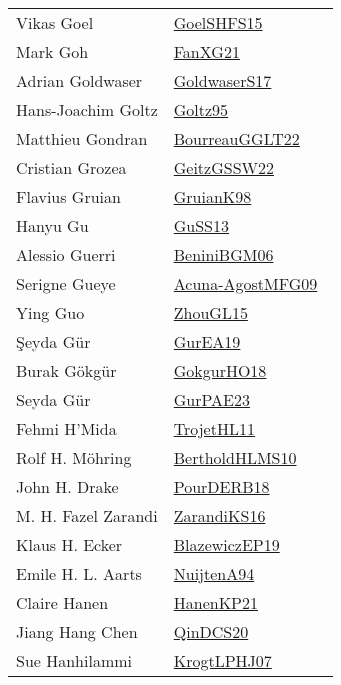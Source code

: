 {\begin{longtable}{p{4cm}p{20cm}}
Vikas Goel & \href{works/GoelSHFS15.pdf}{GoelSHFS15}~\cite{GoelSHFS15}\\
Mark Goh & \href{works/FanXG21.pdf}{FanXG21}~\cite{FanXG21}\\
Adrian Goldwaser & \href{works/GoldwaserS17.pdf}{GoldwaserS17}~\cite{GoldwaserS17}\\
Hans{-}Joachim Goltz & \href{works/Goltz95.pdf}{Goltz95}~\cite{Goltz95}\\
Matthieu Gondran & \href{works/BourreauGGLT22.pdf}{BourreauGGLT22}~\cite{BourreauGGLT22}\\
Cristian Grozea & \href{works/GeitzGSSW22.pdf}{GeitzGSSW22}~\cite{GeitzGSSW22}\\
Flavius Gruian & \href{works/GruianK98.pdf}{GruianK98}~\cite{GruianK98}\\
Hanyu Gu & \href{works/GuSS13.pdf}{GuSS13}~\cite{GuSS13}\\
Alessio Guerri & \href{works/BeniniBGM06.pdf}{BeniniBGM06}~\cite{BeniniBGM06}\\
Serigne Gueye & \href{works/Acuna-AgostMFG09.pdf}{Acuna-AgostMFG09}~\cite{Acuna-AgostMFG09}\\
Ying Guo & \href{works/ZhouGL15.pdf}{ZhouGL15}~\cite{ZhouGL15}\\
Şeyda G{\"u}r & \href{works/GurEA19.pdf}{GurEA19}~\cite{GurEA19}\\
Burak G{\"{o}}kg{\"{u}}r & \href{works/GokgurHO18.pdf}{GokgurHO18}~\cite{GokgurHO18}\\
Seyda G{\"{u}}r & \href{works/GurPAE23.pdf}{GurPAE23}~\cite{GurPAE23}\\
Fehmi H'Mida & \href{works/TrojetHL11.pdf}{TrojetHL11}~\cite{TrojetHL11}\\
Rolf H. M{\"{o}}hring & \href{works/BertholdHLMS10.pdf}{BertholdHLMS10}~\cite{BertholdHLMS10}\\
John H. Drake & \href{works/PourDERB18.pdf}{PourDERB18}~\cite{PourDERB18}\\
M. H. Fazel Zarandi & \href{works/ZarandiKS16.pdf}{ZarandiKS16}~\cite{ZarandiKS16}\\
Klaus H. Ecker & \href{}{BlazewiczEP19}~\cite{BlazewiczEP19}\\
Emile H. L. Aarts & \href{works/NuijtenA94.pdf}{NuijtenA94}~\cite{NuijtenA94}\\
Claire Hanen & \href{works/HanenKP21.pdf}{HanenKP21}~\cite{HanenKP21}\\
Jiang Hang Chen & \href{works/QinDCS20.pdf}{QinDCS20}~\cite{QinDCS20}\\
Sue Hanhilammi & \href{works/KrogtLPHJ07.pdf}{KrogtLPHJ07}~\cite{KrogtLPHJ07}\\

\end{longtable}}
